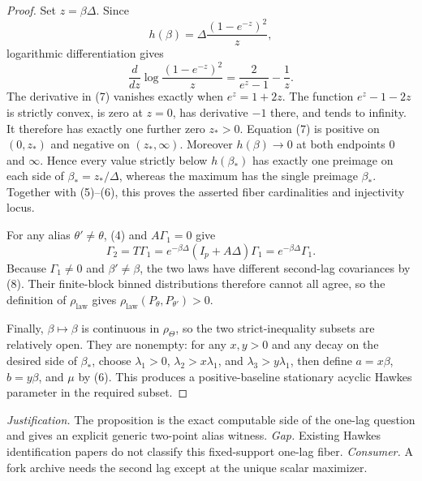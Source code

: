 \documentclass{article}
\begin{document}
\begin{proof}
Set \(z=\beta\Delta\).  Since
\[
 h(\beta)=\Delta\frac{(1-e^{-z})^2}{z},
\]
logarithmic differentiation gives
\[
 \frac{d}{dz}\log\frac{(1-e^{-z})^2}{z}
 =\frac{2}{e^z-1}-\frac1z.
\tag{7}
\]
The derivative in (7) vanishes exactly when \(e^z=1+2z\).  The function \(e^z-1-2z\) is strictly convex, is zero at \(z=0\), has derivative \(-1\) there, and tends to infinity.  It therefore has exactly one further zero \(z_*>0\).  Equation (7) is positive on \((0,z_*)\) and negative on \((z_*,\infty)\).  Moreover \(h(\beta)\to0\) at both endpoints \(0\) and \(\infty\).  Hence every value strictly below \(h(\beta_*)\) has exactly one preimage on each side of \(\beta_*=z_*/\Delta\), whereas the maximum has the single preimage \(\beta_*\).  Together with (5)--(6), this proves the asserted fiber cardinalities and injectivity locus.

For any alias \(\theta'\neq\theta\), (4) and \(A\Gamma_1=0\) give
\[
 \Gamma_2=T\Gamma_1=e^{-\beta\Delta}(I_p+A\Delta)\Gamma_1
 =e^{-\beta\Delta}\Gamma_1.
\tag{8}
\]
Because \(\Gamma_1\neq0\) and \(\beta'\neq\beta\), the two laws have different second-lag covariances by (8).  Their finite-block binned distributions therefore cannot all agree, so the definition of \(\rho_{\mathrm{law}}\) gives \(\rho_{\mathrm{law}}(P_\theta,P_{\theta'})>0\).

Finally, \(\beta\mapsto\beta\) is continuous in \(\rho_\Theta\), so the two strict-inequality subsets are relatively open.  They are nonempty: for any \(x,y>0\) and any decay on the desired side of \(\beta_*\), choose \(\lambda_1>0\), \(\lambda_2>x\lambda_1\), and \(\lambda_3>y\lambda_1\), then define \(a=x\beta\), \(b=y\beta\), and \(\mu\) by (6).  This produces a positive-baseline stationary acyclic Hawkes parameter in the required subset.
\end{proof}
\par\smallskip\noindent \textit{Justification.} The proposition is the exact computable side of the one-lag question and gives an explicit generic two-point alias witness. \textit{Gap.} Existing Hawkes identification papers do not classify this fixed-support one-lag fiber. \textit{Consumer.} A fork archive needs the second lag except at the unique scalar maximizer.
\end{document}

